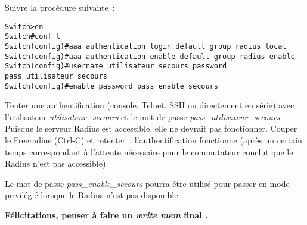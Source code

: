 Suivre la procédure suivante~:

\begin{lstlisting}
Switch>en
Switch#conf t
Switch(config)#aaa authentication login default group radius local
Switch(config)#aaa authentication enable default group radius enable
Switch(config)#username utilisateur_secours password pass_utilisateur_secours
Switch(config)#enable password pass_enable_secours
\end{lstlisting}

Tenter une authentification (console, Telnet, SSH ou directement en série) avec l'utilisateur \emph{utilisateur\_secours} et le mot de passe \emph{pass\_utilisateur\_secours}. Puisque le serveur Radius est accessible, elle ne devrait pas fonctionner. Couper le Freeradius (Ctrl-C) et retenter~: l'authentification fonctionne (après un certain temps correspondant à l'attente nécessaire pour le commutateur conclut que le Radius n'est pas accessible) 

Le mot de passe \emph{pass\_enable\_secours} pourra être utilisé pour passer en mode privilégié lorsque le Radius n'est pas disponible.

\textbf{Félicitations, penser à faire un \emph{write mem} final \Coffeecup.}
